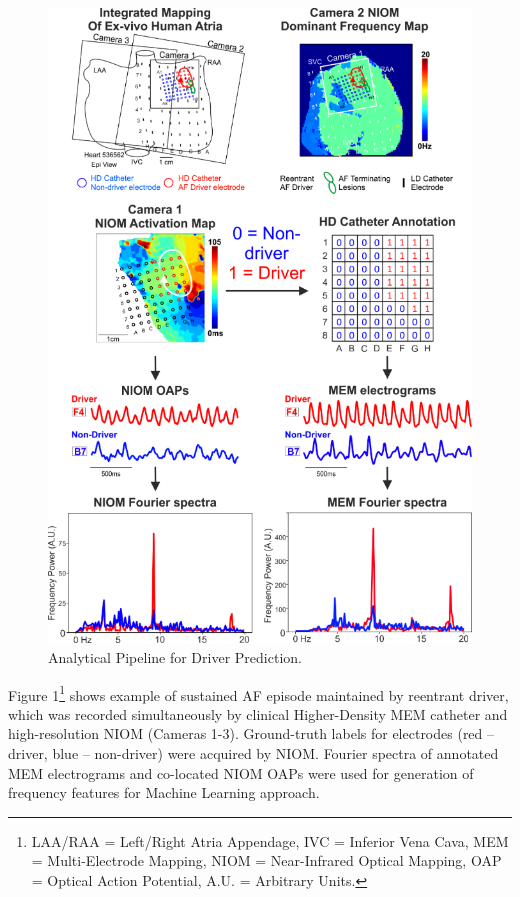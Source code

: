 \documentclass{article}
\begin{document}
\begin{figure}[ht]
\vskip 0.2in
\begin{center}
\centerline{\includegraphics[width=\columnwidth]{image1.png}}
\caption{Analytical Pipeline for Driver Prediction.}
\label{icml-historical}
\end{center}
\vskip -0.2in
\end{figure}

Figure 1\footnote{LAA/RAA = Left/Right Atria Appendage, IVC = Inferior Vena Cava, MEM = Multi-Electrode Mapping, NIOM = Near-Infrared Optical Mapping, OAP = Optical Action Potential, A.U. = Arbitrary Units.} shows example of sustained AF episode maintained by reentrant driver, which was recorded simultaneously by clinical Higher-Density MEM catheter and high-resolution NIOM (Cameras 1-3). Ground-truth labels for electrodes (red – driver, blue – non-driver) were acquired by NIOM. Fourier spectra of annotated MEM electrograms and co-located NIOM OAPs were used for generation of frequency features for Machine Learning approach. 
\end{document}
